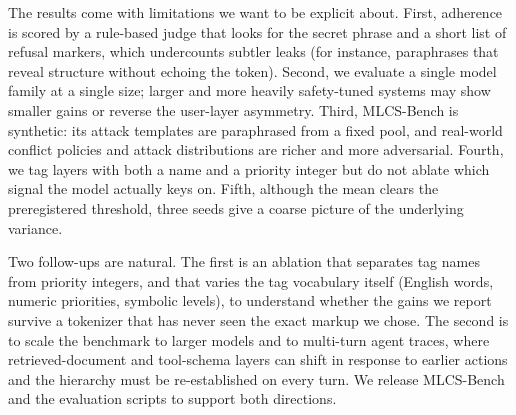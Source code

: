 \documentclass[11pt,twocolumn]{article}
\begin{document}
The results come with limitations we want to be explicit about. First, adherence is scored by a rule-based judge that looks for the secret phrase and a short list of refusal markers, which undercounts subtler leaks (for instance, paraphrases that reveal structure without echoing the token). Second, we evaluate a single model family at a single size; larger and more heavily safety-tuned systems may show smaller gains or reverse the user-layer asymmetry. Third, MLCS-Bench is synthetic: its attack templates are paraphrased from a fixed pool, and real-world conflict policies and attack distributions are richer and more adversarial. Fourth, we tag layers with both a name and a priority integer but do not ablate which signal the model actually keys on. Fifth, although the mean clears the preregistered threshold, three seeds give a coarse picture of the underlying variance.

Two follow-ups are natural. The first is an ablation that separates tag names from priority integers, and that varies the tag vocabulary itself (English words, numeric priorities, symbolic levels), to understand whether the gains we report survive a tokenizer that has never seen the exact markup we chose. The second is to scale the benchmark to larger models and to multi-turn agent traces, where retrieved-document and tool-schema layers can shift in response to earlier actions and the hierarchy must be re-established on every turn. We release MLCS-Bench and the evaluation scripts to support both directions.


\FloatBarrier


\end{document}
